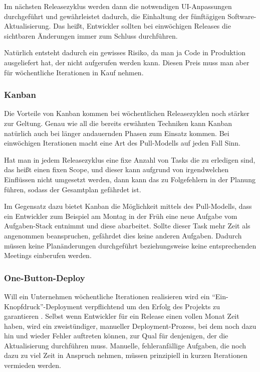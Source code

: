 Im nächsten Releasezyklus werden dann die notwendigen UI-Anpas\-sun\-gen durchgeführt und gewährleistet dadurch, die Einhaltung der fünftägigen Software-Aktualisierung. Das heißt, Entwickler sollten bei einwöchigen Releases die sichtbaren Änderungen immer zum Schluss durchführen.

Natürlich entsteht dadurch ein gewisses Risiko, da man ja Code in Produktion ausgeliefert hat, der nicht aufgerufen werden kann. Diesen Preis muss man aber für wöchentliche Iterationen in Kauf nehmen.

\subsubsection{Kanban}
Die Vorteile von Kanban \cite{Boeg2011} kommen bei wöchentlichen Releasezyklen noch stärker zur Geltung. Genau wie all die bereits erwähnten Techniken kann Kanban natürlich auch bei länger andauernden Phasen zum Einsatz kommen. Bei einwöchigen Iterationen macht eine Art des Pull-Modells auf jeden Fall Sinn. 

Hat man in jedem Releasezyklus eine fixe Anzahl von Tasks die zu erledigen sind, das heißt einen fixen Scope, und dieser kann aufgrund von irgendwelchen Einflüssen nicht umgesetzt werden, dann kann das zu Folgefehlern in der Planung führen, sodass der Gesamtplan gefährdet ist. 

Im Gegensatz dazu bietet Kanban die Möglichkeit mittels des Pull-Modells, dass ein Entwickler zum Beispiel am Montag in der Früh eine neue Aufgabe vom Aufgaben-Stack entnimmt und diese abarbeitet. Sollte dieser Task mehr Zeit als angenommen beanspruchen, gefährdet dies keine anderen Aufgaben. Dadurch müssen keine Planänderungen durchgeführt beziehungsweise keine entsprechenden Meetings einberufen werden.

\subsubsection{One-Button-Deploy}
Will ein Unternehmen wöchentliche Iterationen realisieren wird ein \enquote{Ein-Knopf\-druck}-Deploy\-ment verpflichtend um den Erfolg des Projekts zu garantieren \cite{humble2010continuous}. Selbst wenn Entwickler für ein Release einen vollen Monat Zeit haben, wird ein zweistündiger, manueller Deployment-Prozess, bei dem noch dazu hin und wieder Fehler auftreten können, zur Qual für denjenigen, der die Aktualisierung durchführen muss. Manuelle, fehleranfällige Aufgaben, die noch dazu zu viel Zeit in Anspruch nehmen, müssen prinzipiell in kurzen Iterationen vermieden werden.

